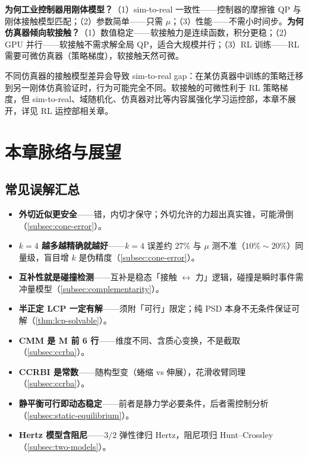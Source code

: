 \noindent \textbf{为何工业控制器用刚体模型？}（1）sim-to-real 一致性——控制器的摩擦锥 QP 与刚体接触模型匹配；（2）参数简单——只需 $\mu$；（3）性能——不需小时间步。\textbf{为何仿真器倾向软接触？}（1）数值稳定——软接触力是连续函数，积分更稳；（2）GPU 并行——软接触不需求解全局 QP，适合大规模并行；（3）RL 训练——RL 需要可微仿真器（策略梯度），软接触天然可微。

\begin{pitfall}
不同仿真器的接触模型差异会导致 sim-to-real gap：在某仿真器中训练的策略迁移到另一刚体仿真验证时，行为可能完全不同。软接触的可微性利于 RL 策略梯度，但 sim-to-real、域随机化、仿真器对比等内容属强化学习运控部，本章不展开，详见 RL 运控部相关章。
\end{pitfall}

\section{本章脉络与展望}
\label{sec:contact-outlook}

\subsection{常见误解汇总}
\label{subsec:misconceptions}

\begin{itemize}
  \item \textbf{外切近似更安全}——错，内切才保守；外切允许的力超出真实锥，可能滑倒（\cref{subsec:cone-error}）。
  \item \textbf{$k=4$ 越多越精确就越好}——$k=4$ 误差约 $27\%$ 与 $\mu$ 测不准（$10\%\sim20\%$）同量级，盲目增 $k$ 是伪精度（\cref{subsec:cone-error}）。
  \item \textbf{互补性就是碰撞检测}——互补是稳态「接触 $\leftrightarrow$ 力」逻辑，碰撞是瞬时事件需冲量模型（\cref{subsec:complementarity}）。
  \item \textbf{半正定 LCP 一定有解}——须附「可行」限定；纯 PSD 本身不无条件保证可解（\cref{thm:lcp-solvable}）。
  \item \textbf{CMM 是 $\mathbf{M}$ 前 6 行}——维度不同、含质心变换，不是截取（\cref{subsec:ccrba}）。
  \item \textbf{CCRBI 是常数}——随构型变（蜷缩 vs 伸展），花滑收臂同理（\cref{subsec:ccrba}）。
  \item \textbf{静平衡可行即动态稳定}——前者是静力学必要条件，后者需控制分析（\cref{subsec:static-equilibrium}）。
  \item \textbf{Hertz 模型含阻尼}——$3/2$ 弹性律归 Hertz，阻尼项归 Hunt--Crossley（\cref{subsec:two-models}）。
\end{itemize}

